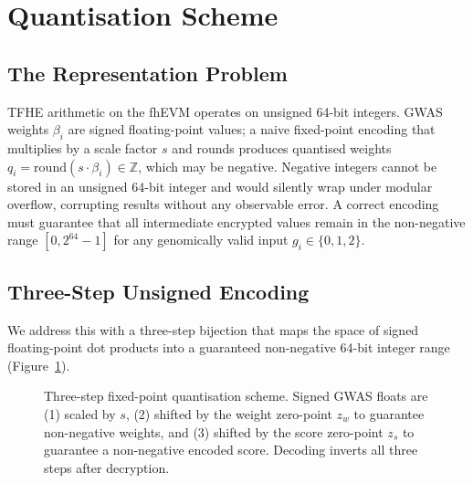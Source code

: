 \documentclass[10pt,twocolumn]{article}
\begin{document}
\section{Quantisation Scheme}
\label{sec:quantization}

\subsection{The Representation Problem}

TFHE arithmetic on the fhEVM operates on unsigned 64-bit integers.
GWAS weights $\beta_i$ are signed floating-point values;
a naive fixed-point encoding that multiplies by a scale factor $s$ and rounds
produces quantised weights $q_i = \mathrm{round}(s \cdot \beta_i) \in \mathbb{Z}$,
which may be negative.  Negative integers cannot be stored in an unsigned 64-bit
integer and would silently wrap under modular overflow, corrupting results without any
observable error.  A correct encoding must guarantee that all intermediate encrypted
values remain in the non-negative range $[0, 2^{64} - 1]$ for any genomically valid
input $g_i \in \{0, 1, 2\}$.

\subsection{Three-Step Unsigned Encoding}

We address this with a three-step bijection that maps the space of signed
floating-point dot products into a guaranteed non-negative 64-bit integer range
(Figure~\ref{fig:quantization}).

\begin{figure}[t]
  \centering
  \caption{Three-step fixed-point quantisation scheme.  Signed GWAS floats are
  (1) scaled by $s$, (2) shifted by the weight zero-point $z_w$ to guarantee
  non-negative weights, and (3) shifted by the score zero-point $z_s$ to guarantee
  a non-negative encoded score.  Decoding inverts all three steps after decryption.}
  \label{fig:quantization}
\end{figure}
\end{document}
